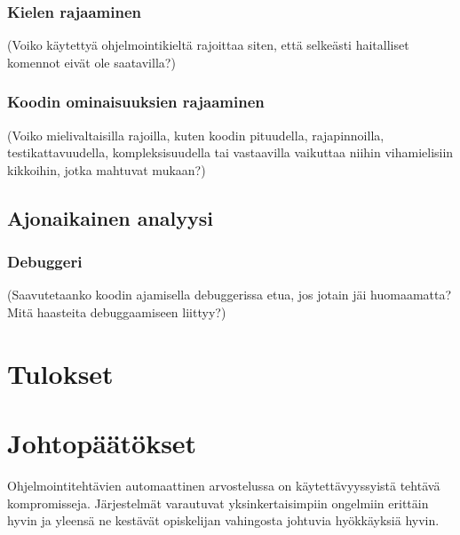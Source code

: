 \subsubsection{Kielen rajaaminen}

(Voiko käytettyä ohjelmointikieltä rajoittaa siten, että selkeästi haitalliset
komennot eivät ole saatavilla?)

\subsubsection{Koodin ominaisuuksien rajaaminen}

(Voiko mielivaltaisilla rajoilla, kuten koodin pituudella, rajapinnoilla,
testikattavuudella, kompleksisuudella tai vastaavilla vaikuttaa niihin
vihamielisiin kikkoihin, jotka mahtuvat mukaan?)

\subsection{Ajonaikainen analyysi}

\subsubsection{Debuggeri}

(Saavutetaanko koodin ajamisella debuggerissa etua, jos jotain jäi huomaamatta?
Mitä haasteita debuggaamiseen liittyy?)


\section{Tulokset}
\label{sec:tulos}


\section{Johtopäätökset}
\label{sec:paketointi}

Ohjelmointitehtävien automaattinen arvostelussa on käytettävyyssyistä tehtävä kompromisseja.
Järjestelmät varautuvat yksinkertaisimpiin ongelmiin erittäin hyvin ja yleensä ne kestävät
opiskelijan vahingosta johtuvia hyökkäyksiä hyvin. 

\pagebreak

\pagebreak
